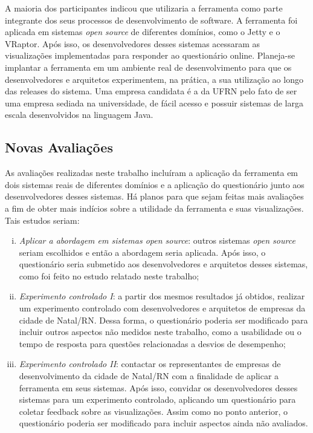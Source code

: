 A maioria dos participantes indicou que utilizaria a ferramenta como parte integrante dos seus processos de desenvolvimento de software. A ferramenta foi aplicada em sistemas \textit{open source} de diferentes domínios, como o Jetty e o VRaptor. Após isso, os desenvolvedores desses sistemas acessaram as visualizações implementadas para responder ao questionário online. Planeja-se implantar a ferramenta em um ambiente real de desenvolvimento para que os desenvolvedores e arquitetos experimentem, na prática, a sua utilização ao longo das releases do sistema. Uma empresa candidata é a da UFRN pelo fato de ser uma empresa sediada na universidade, de fácil acesso e possuir sistemas de larga escala desenvolvidos na linguagem Java.

\subsection{Novas Avaliações}

As avaliações realizadas neste trabalho incluíram a aplicação da ferramenta em dois sistemas reais de diferentes domínios e a aplicação do questionário junto aos desenvolvedores desses sistemas. Há planos para que sejam feitas mais avaliações a fim de obter mais indícios sobre a utilidade da ferramenta e suas visualizações. Tais estudos seriam:
\begin{enumerate}[(i)]
	\item \textit{Aplicar a abordagem em sistemas open source}: outros sistemas \textit{open source} seriam escolhidos e então a abordagem seria aplicada. Após isso, o questionário seria submetido aos desenvolvedores e arquitetos desses sistemas, como foi feito no estudo relatado neste trabalho;
	\item \textit{Experimento controlado I}: a partir dos mesmos resultados já obtidos, realizar um experimento controlado com desenvolvedores e arquitetos de empresas da cidade de Natal/RN. Dessa forma, o questionário poderia ser modificado para incluir outros aspectos não medidos neste trabalho, como a usabilidade ou o tempo de resposta para questões relacionadas a desvios de desempenho;
	\item \textit{Experimento controlado II}: contactar os representantes de empresas de desenvolvimento da cidade de Natal/RN com a finalidade de aplicar a ferramenta em seus sistemas. Após isso, convidar os desenvolvedores desses sistemas para um experimento controlado, aplicando um questionário para coletar feedback sobre as visualizações. Assim como no ponto anterior, o questionário poderia ser modificado para incluir aspectos ainda não avaliados.
\end{enumerate}

